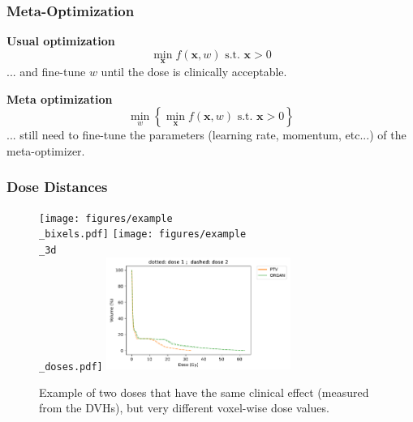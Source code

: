\documentclass{beamer}
\begin{document}
	\begin{frame}
		\frametitle{Meta-Optimization}
		\textbf{Usual optimization}
		$$\min_{\textbf{x}} f(\textbf{x}, w) \text{ s.t. } \textbf{x} > 0$$
		... and fine-tune $w$ until the dose is clinically acceptable.
		
		\vspace{0.5cm}
		
		\textbf{Meta optimization}
		$$\min_w \left\lbrace \min_{\textbf{x}} f(\textbf{x}, w) \text{ s.t. } \textbf{x} > 0 \right\rbrace $$
		... still need to fine-tune the parameters (learning rate, momentum, etc...) of the meta-optimizer.
		
	\end{frame}
	
	\begin{frame}
		\frametitle{Dose Distances}
		
		\begin{figure}
			\vspace{-0.5cm}
			\texttt{[image: figures/example\\\_bixels.pdf]}
			\texttt{[image: figures/example\\\_3d\\\_doses.pdf]}
			\vspace{-0.3cm}
			\includegraphics[width=6cm]{figures/example_dvh.pdf}
			
			\caption{Example of two doses that have the same clinical effect (measured from the DVHs), but very different voxel-wise dose values.}
		\end{figure}
		
	\end{frame}
	
	
\end{document}
